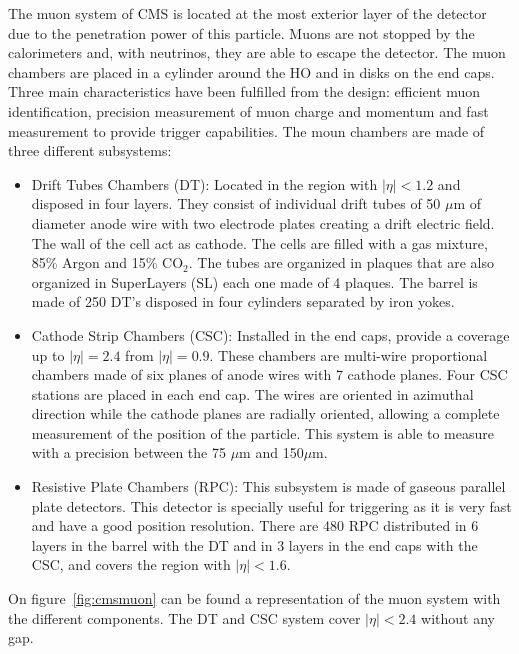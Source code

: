 The muon system of CMS is located at the most exterior layer of the detector  due to the penetration power of this particle. Muons are not stopped by the calorimeters and, with neutrinos, they are able to escape the detector. The muon chambers are placed in a cylinder around the HO and in disks on the end caps. Three main characteristics have been fulfilled from the design: efficient muon identification, precision measurement of muon charge and momentum and fast measurement to provide trigger capabilities. The moun chambers are made of three different subsystems:
\begin{itemize}
\item Drift Tubes Chambers (DT): Located in the region with $|\eta|<1.2$ and disposed in four layers. They consist of individual drift tubes of 50 $\mu$m of diameter anode wire with two electrode plates creating a drift electric field. The wall of the cell act as cathode. The cells are filled with a gas mixture, 85\% Argon and 15\% $\text{CO}_{2}$. The tubes are organized in plaques that are also organized in SuperLayers (SL) each one made of 4 plaques. The barrel is made of 250 DT's disposed in four cylinders separated by iron yokes. 
\item Cathode Strip Chambers (CSC): Installed in the end caps, provide a coverage up to $|\eta|=2.4$ from $|\eta|=0.9$. These chambers are multi-wire proportional chambers made of six planes of anode wires with 7 cathode planes. Four CSC stations are placed in each end cap. The wires are oriented in azimuthal direction while the cathode planes are radially oriented, allowing a complete measurement of the position of the particle. This system is able to measure with a precision between the 75 $\mu$m and 150$\mu$m.
\item Resistive Plate Chambers (RPC): This subsystem is made of gaseous parallel plate detectors. This detector is specially useful for triggering as it is very fast and have a good position resolution. There are 480 RPC distributed in 6 layers in the barrel with the DT and in 3 layers in the end caps with the CSC, and covers the region with $|\eta|<1.6$. 
\end{itemize}

On figure~\ref{fig:cmsmuon} can be found a representation of the muon system with the different components. The DT and CSC system cover $|\eta|<2.4$ without any gap. 

